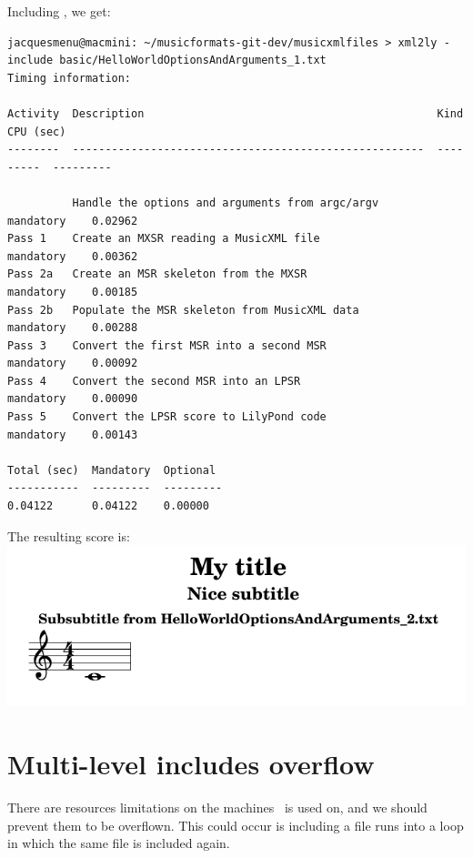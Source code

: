 Including , we get:
\begin{lstlisting}[language=Terminal]
jacquesmenu@macmini: ~/musicformats-git-dev/musicxmlfiles > xml2ly -include basic/HelloWorldOptionsAndArguments_1.txt
Timing information:

Activity  Description                                             Kind       CPU (sec)
--------  ------------------------------------------------------  ---------  ---------

          Handle the options and arguments from argc/argv         mandatory    0.02962
Pass 1    Create an MXSR reading a MusicXML file                  mandatory    0.00362
Pass 2a   Create an MSR skeleton from the MXSR                    mandatory    0.00185
Pass 2b   Populate the MSR skeleton from MusicXML data            mandatory    0.00288
Pass 3    Convert the first MSR into a second MSR                 mandatory    0.00092
Pass 4    Convert the second MSR into an LPSR                     mandatory    0.00090
Pass 5    Convert the LPSR score to LilyPond code                 mandatory    0.00143

Total (sec)  Mandatory  Optional
-----------  ---------  ---------
0.04122      0.04122    0.00000
\end{lstlisting}

The resulting score is:\\
\includegraphics[scale=0.7]{../graphics/HelloWorldWithMultiLevelInclude.png}


\section{Multi-level includes overflow}

There are resources limitations on the machines \mf\ is used on, and we should prevent them to be overflown. This could occur is including a file runs into a loop in which the same file is included again.


